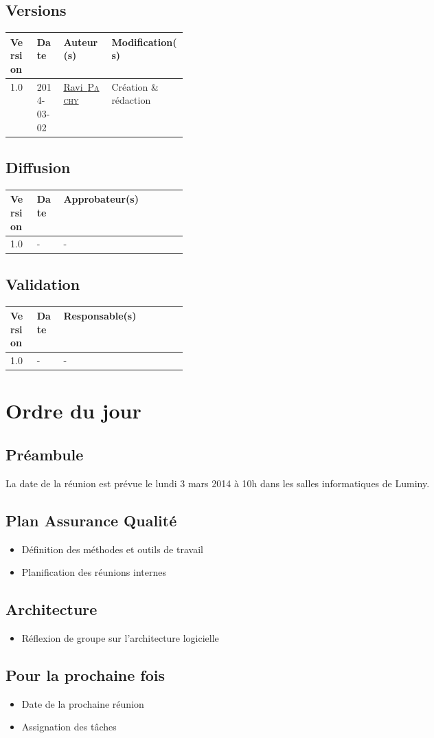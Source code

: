\documentclass[11pt,fleqn]{book} %
\makeatletter
\newcommand{\ravi}{\href{mailto:pachy.ravi@gmail.com}{Ravi~\textsc{Pachy}}\xspace}
\makeatother
\begin{document}
\section*{Versions}
\begin{tabularx}{\linewidth}{m{0.15\linewidth} m{0.15\linewidth} X X}
	\toprule
	Version & Date & Auteur(s) & Modification(s) \\
	\midrule
	1.0 & 2014-03-02 & \ravi & Création \& rédaction \\
	\bottomrule
\end{tabularx}

\section*{Diffusion}
\begin{tabularx}{\linewidth}{m{0.15\linewidth} m{0.15\linewidth} X}
	\toprule
	Version & Date & Approbateur(s) \\
	\midrule
	1.0 & - & - \\
	\bottomrule
\end{tabularx}

\section*{Validation}
\begin{tabularx}{\linewidth}{m{0.15\linewidth} m{0.15\linewidth} X}
	\toprule
	Version & Date & Responsable(s) \\
	\midrule
	1.0 & - & - \\
	\bottomrule
\end{tabularx}

\vfill

\chapter{Ordre du jour}

\section*{Préambule}
La date de la réunion est prévue le lundi 3 mars 2014 à 10h dans les salles informatiques de Luminy.

\section{Plan Assurance Qualité}
\begin{itemize}
\item Définition des méthodes et outils de travail
\item Planification des réunions internes
\end{itemize}

\section{Architecture}
\begin{itemize}
\item Réflexion de groupe sur l'architecture logicielle
\end{itemize}

\section{Pour la prochaine fois}
\begin{itemize}
\item Date de la prochaine réunion
\item Assignation des tâches
\end{itemize}
\end{document}
